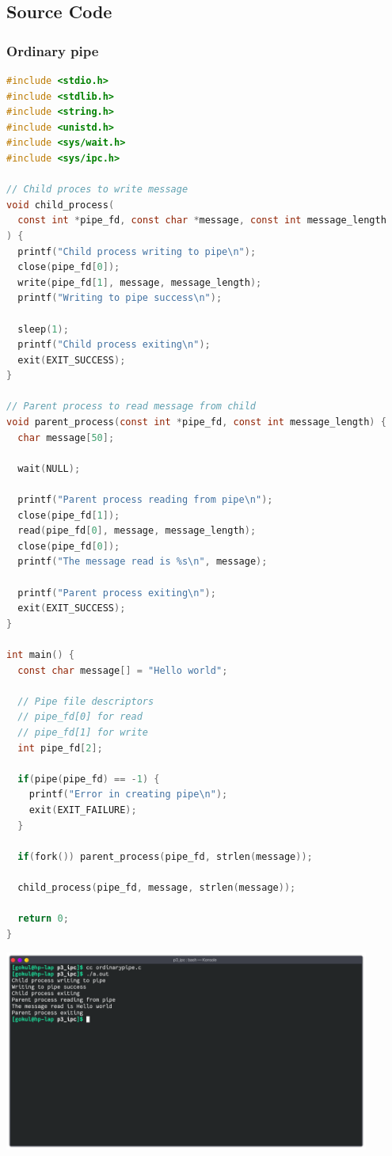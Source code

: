 \subsection{Source Code}
\subsubsection{Ordinary pipe}
\begin{lstlisting}[language=C]
#include <stdio.h>
#include <stdlib.h>
#include <string.h>
#include <unistd.h>
#include <sys/wait.h>
#include <sys/ipc.h>

// Child proces to write message
void child_process(
  const int *pipe_fd, const char *message, const int message_length
) {
  printf("Child process writing to pipe\n");
  close(pipe_fd[0]);
  write(pipe_fd[1], message, message_length);
  printf("Writing to pipe success\n");

  sleep(1);
  printf("Child process exiting\n");
  exit(EXIT_SUCCESS);
}

// Parent process to read message from child 
void parent_process(const int *pipe_fd, const int message_length) {
  char message[50];

  wait(NULL);

  printf("Parent process reading from pipe\n");
  close(pipe_fd[1]);
  read(pipe_fd[0], message, message_length);
  close(pipe_fd[0]);
  printf("The message read is %s\n", message);

  printf("Parent process exiting\n");
  exit(EXIT_SUCCESS);
}

int main() {
  const char message[] = "Hello world";
  
  // Pipe file descriptors
  // pipe_fd[0] for read
  // pipe_fd[1] for write
  int pipe_fd[2];

  if(pipe(pipe_fd) == -1) {
    printf("Error in creating pipe\n");
    exit(EXIT_FAILURE);
  }

  if(fork()) parent_process(pipe_fd, strlen(message));

  child_process(pipe_fd, message, strlen(message));
  
  return 0;
}
\end{lstlisting}

\begin{center}
	\includegraphics[width=0.90\textwidth]{img/p4/ss1.png}
\end{center}


